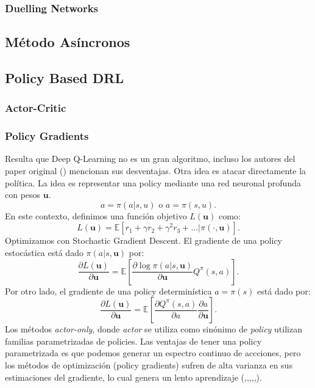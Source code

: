 \documentclass[11pt]{article}
\theoremstyle{plain}
\begin{document}
\subsubsection{Duelling Networks}
\subsection{Método Asíncronos}  
\subsection{Policy Based DRL}
\subsubsection{Actor-Critic}
\subsubsection{Policy Gradients}
Resulta que Deep Q-Learning no es un gran algoritmo, incluso los autores del paper original (\cite{DBLP:journals/corr/MnihBMGLHSK16}) mencionan sus desventajas. 
Otra idea es atacar directamente la política.
La idea es representar una policy mediante una red neuronal profunda con pesos $\textbf{u}$.
\[ a = \pi (a|s,u) \textrm{ o } a = \pi (s,u). \]
En este contexto, definimos una función objetivo $L(\textbf{u})$ como:
		\[ L(\textbf{u}) = \mathbb{E}[r_1 + \gamma r_2 + \gamma^2 r_3 + ... |  \pi(\cdot,\textbf{u})]. \]
Optimizamos con Stochastic Gradient Descent. El gradiente de una policy estocástica está dado $\pi (a|s,\textbf{u})$ por:
		\[ \frac{\partial L(\textbf{u})}{\partial \textbf{u}}  = \mathbb{E}\left[  \frac{\partial \log \pi(a|s,\textbf{u})}{\partial \textbf{u}}Q^\pi(s,a)\right].\]
Por otro lado, el gradiente de una policy determinística $a=\pi(s)$ está dado por:
\[ \frac{\partial L(\textbf{u})}{\partial \textbf{u}}  = \mathbb{E}\left[ \frac{\partial Q^\pi (s,a)}{\partial a} \frac{\partial a}{\partial \textbf{u}} \right]. \]
 Los métodos \textit{actor-only}, donde \textit{actor} se utiliza como sinónimo de \textit{policy} utilizan familias parametrizadas de policies. Las ventajas de tener una policy parametrizada es que podemos generar un espectro continuo de accciones, pero los métodos de optimización (policy gradients) sufren de alta varianza en sus estimaciones del gradiente, lo cual genera un lento aprendizaje (\cite{grondman2012survey},\cite{konda2003onactor},\cite{richter2007natural},\cite{boyan2002technical},\cite{baxter2001infinite},\cite{berenji2003convergent}).\\
\end{document}
